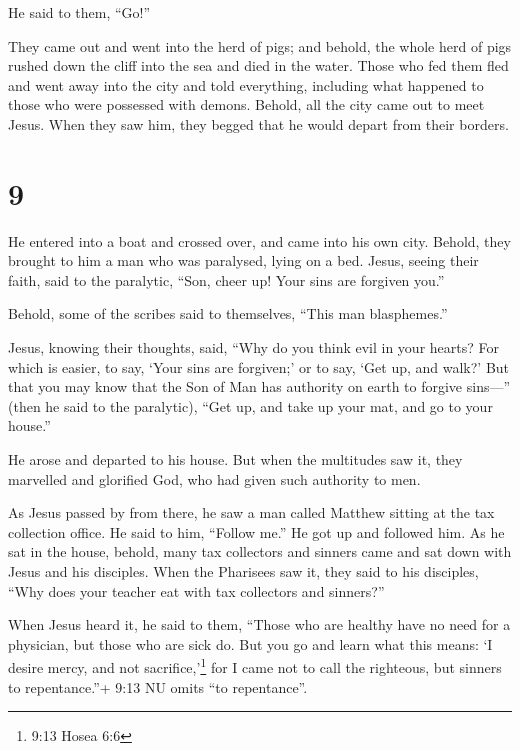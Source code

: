  He said to them, ``Go!''

They came out and went into the herd of pigs; and behold, the whole herd
of pigs rushed down the cliff into the sea and died in the water.
 Those who fed them fled and went away into the city and
told everything, including what happened to those who were possessed
with demons.  Behold, all the city came out to meet Jesus.
When they saw him, they begged that he would depart from their borders.

\hypertarget{section-8}{%
\section{9}\label{section-8}}

 He entered into a boat and crossed over, and came into his
own city.  Behold, they brought to him a man who was
paralysed, lying on a bed. Jesus, seeing their faith, said to the
paralytic, ``Son, cheer up! Your sins are forgiven you.''

 Behold, some of the scribes said to themselves, ``This man
blasphemes.''

 Jesus, knowing their thoughts, said, ``Why do you think
evil in your hearts?  For which is easier, to say, `Your
sins are forgiven;' or to say, `Get up, and walk?'  But that
you may know that the Son of Man has authority on earth to forgive
sins---'' (then he said to the paralytic), ``Get up, and take up your
mat, and go to your house.''

 He arose and departed to his house.  But when
the multitudes saw it, they marvelled and glorified God, who had given
such authority to men.

 As Jesus passed by from there, he saw a man called Matthew
sitting at the tax collection office. He said to him, ``Follow me.'' He
got up and followed him.  As he sat in the house, behold,
many tax collectors and sinners came and sat down with Jesus and his
disciples.  When the Pharisees saw it, they said to his
disciples, ``Why does your teacher eat with tax collectors and
sinners?''

 When Jesus heard it, he said to them, ``Those who are
healthy have no need for a physician, but those who are sick do.
 But you go and learn what this means: `I desire mercy, and
not sacrifice,'\footnote{9:13 Hosea 6:6} for I came not to call the
righteous, but sinners to repentance.''+ 9:13 NU omits ``to
repentance''.

